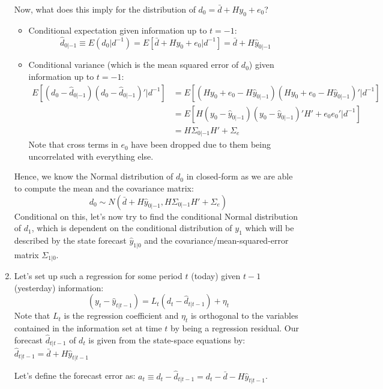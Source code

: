 \begin{enumerate}
	Now, what does this imply for the distribution of $d_0 = \bar{d} + H y_0 + e_0$?
	\begin{itemize}
		\item Conditional expectation given information up to $t=-1$:
		$$\hat{d}_{0|-1} \equiv E(d_0|d^{-1}) = E[\bar{d} + Hy_0+e_0|d^{-1}] = \bar{d} + H \hat{y}_{0|-1}$$
		\item Conditional variance (which is the mean squared error of $d_0$) given information up to $t=-1$:
		\begin{align*}
			E\left[(d_0 - \hat{d}_{0|-1}) (d_0 - \hat{d}_{0|-1})'| d^{-1}\right] &= E\left[(Hy_0+e_0-H\hat{y}_{0|-1}) (Hy_0+e_0-H\hat{y}_{0|-1})' | d^{-1}\right]
			\\
			&= E\left[H(y_0-\hat{y}_{0|-1}) (y_0-\hat{y}_{0|-1})'H' + e_0e_0' | d^{-1}\right]
			\\
			&= H \Sigma_{0|-1}H' + \Sigma_e
		\end{align*}
		Note that cross terms in $e_0$ have been dropped due to them being uncorrelated with everything else.
	\end{itemize}
	Hence, we know the Normal distribution of $d_0$ in closed-form as we are able to compute the mean and the covariance matrix:
	$$d_0 \sim N(\bar{d} + H \hat{y}_{0|-1} , H \Sigma_{0|-1}H' + \Sigma_e) $$
	Conditional on this, let's now try to find the conditional Normal distribution of $d_1$, which is dependent on the conditional distribution of $y_1$ which will be described by the state forecast $\hat{y}_{1|0}$ and the covariance\slash mean-squared-error matrix $\Sigma_{1|0}$.

	\item Let's set up such a regression for some period $t$ (today) given $t-1$ (yesterday) information:
	$$(y_t-\hat{y}_{t|t-1}) = L_t (d_t - \hat{d}_{t|t-1}) + \eta_t$$	
	Note that $L_t$ is the regression coefficient and $\eta_t$ is orthogonal to the variables contained in the information set at time $t$ by being a regression residual. Our forecast $\hat{d}_{t|t-1}$ of $d_t$ is given from the state-space equations by: $\hat{d}_{t|t-1} = \bar{d} + H \hat{y}_{t|t-1}$
	
	Let's define the forecast error as: $a_t \equiv d_t - \hat{d}_{t|t-1} = d_t - \bar{d} - H\hat{y}_{t|t-1}$.
	

\end{enumerate}
